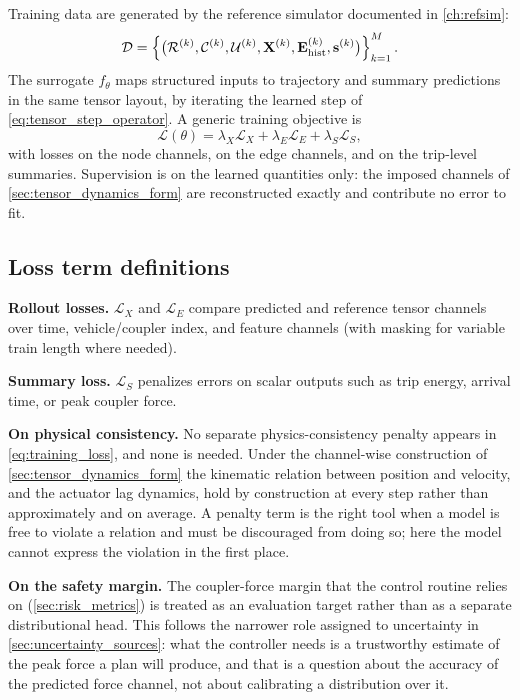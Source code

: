 Training data are generated by the reference simulator documented in \cref{ch:refsim}:
\begin{equation}
    \mathcal{D}=\left\{
    \bigl(\mathcal{R}^{(k)},\mathcal{C}^{(k)},\mathcal{U}^{(k)},\mathbf{X}^{(k)},\mathbf{E}_{\mathrm{hist}}^{(k)},\mathbf{s}^{(k)}\bigr)
    \right\}_{k=1}^{M}.
\end{equation}
The surrogate $f_\theta$ maps structured inputs to trajectory and summary predictions in the same tensor layout, by iterating the learned step of \cref{eq:tensor_step_operator}.
A generic training objective is
\begin{equation}
    \mathcal{L}(\theta)=
    \lambda_X \mathcal{L}_X +
    \lambda_E \mathcal{L}_E +
    \lambda_S \mathcal{L}_S,
    \label{eq:training_loss}
\end{equation}
with losses on the node channels, on the edge channels, and on the trip-level summaries.
Supervision is on the learned quantities only: the imposed channels of \cref{sec:tensor_dynamics_form} are reconstructed exactly and contribute no error to fit.

\subsection{Loss term definitions}

\textbf{Rollout losses.} $\mathcal{L}_X$ and $\mathcal{L}_E$ compare predicted and reference tensor channels over time, vehicle/coupler index, and feature channels (with masking for variable train length where needed).

\textbf{Summary loss.} $\mathcal{L}_S$ penalizes errors on scalar outputs such as trip energy, arrival time, or peak coupler force.

\textbf{On physical consistency.} No separate physics-consistency penalty appears in \cref{eq:training_loss}, and none is needed.
Under the channel-wise construction of \cref{sec:tensor_dynamics_form} the kinematic relation between position and velocity, and the actuator lag dynamics, hold by construction at every step rather than approximately and on average.
A penalty term is the right tool when a model is free to violate a relation and must be discouraged from doing so; here the model cannot express the violation in the first place.

\textbf{On the safety margin.} The coupler-force margin that the control routine relies on (\cref{sec:risk_metrics}) is treated as an evaluation target rather than as a separate distributional head.
This follows the narrower role assigned to uncertainty in \cref{sec:uncertainty_sources}: what the controller needs is a trustworthy estimate of the peak force a plan will produce, and that is a question about the accuracy of the predicted force channel, not about calibrating a distribution over it.

